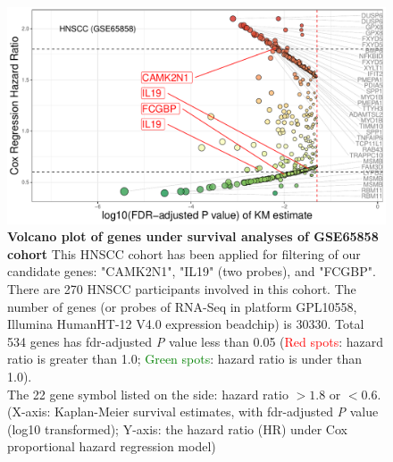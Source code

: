 \documentclass[preprint,12pt]{elsarticle}
\newcommand{\bcaption}[2]{\caption{\textbf{#1} #2}}
\newenvironment{MyColorPar}[1]{%
    \leavevmode\color{#1}\ignorespaces%
}{%
}%
\begin{document}
\begin{MyColorPar}{blue}
\begin{figure}
    \centering
    \includegraphics[width=13cm]{Rplot_GSE65858_CoxHR_CAMK2N1_top3FDRKM.pdf}
    \bcaption{Volcano plot of genes under survival analyses of GSE65858 cohort}{
    This HNSCC cohort has been applied for filtering of our candidate genes: "CAMK2N1", "IL19" (two probes), and "FCGBP".
    There are 270 HNSCC participants involved in this cohort.
    The number of genes (or probes of RNA-Seq in platform GPL10558, Illumina HumanHT-12 V4.0 expression beadchip) is 30330.
    Total 534 genes has \acrshort{fdr}-adjusted \textit{P} value less than 0.05
    (\textcolor{red}{Red spots}: hazard ratio is greater than 1.0;
    \textcolor{green}{Green spots}: hazard ratio is under than 1.0).\\
    The 22 gene symbol listed on the side: hazard ratio $> 1.8$ or $< 0.6$.\\
    (X-axis: Kaplan-Meier survival estimates, with \acrshort{fdr}-adjusted \textit{P} value (log10 transformed);
    Y-axis: the hazard ratio (HR) under Cox proportional hazard regression model)
    }
    \label{fig:hazards534}
\end{figure}







\end{MyColorPar}
\end{document}
